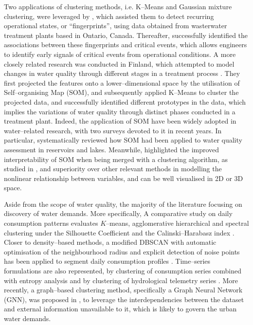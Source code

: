 Two applications of clustering methods, i.e. K–Means and Gaussian mixture clustering, were leveraged by \cite{ref_13}, which assisted them to detect recurring operational states, or ``fingerprints'', using data obtained from wasterwater treatment plants based in Ontario, Canada.
Thereafter, successfully identified the associations between these fingerprints and critical events, which allows engineers to identify early signals of critical events from operational conditions.
A more closely related research was conducted in Finland, which attempted to model changes in water quality through different stages in a treatment process \cite{ref_14}. They first projected the features onto a lower–dimensional space by the utilisation of Self–organising Map (SOM), and subsequently applied K–Means to cluster the projected data, and successfully identified different prototypes in the data, which implies the variations of water quality through distinct phases conducted in a treatment plant.
Indeed, the application of SOM have been widely adopted in water–related research, with two surveys devoted to it in recent years. In particular, \cite{ref_15} systematically reviewed how SOM had been applied to water quality assessment in reservoirs and lakes. 
Meanwhile, \cite{ref_16} highlighted the improved interpretability of SOM when being merged with a clustering algorithm, as studied in \cite{ref_14}, and superiority over other relevant methods in modelling the nonlinear relationship between variables, and can be well visualised in 2D or 3D space.

Aside from the scope of water quality, the majority of the literature focusing on discovery of water demands. More specifically, 
A comparative study on daily consumption patterns evaluates $K$–means, agglomerative hierarchical and spectral clustering under the Silhouette Coefficient and the Calinski–Harabasz index \cite{ref_17}.
Closer to density–based methods, a modified DBSCAN with automatic optimisation of the neighbourhood radius and explicit detection of noise points has been applied to segment daily consumption profiles \cite{ref_18}.
Time–series formulations are also represented, by clustering of consumption series combined with entropy analysis \cite{ref_19} and by clustering of hydrological telemetry series \cite{ref_20}.
More recently, a graph–based clustering method, specifically a Graph Neural Network (GNN), was proposed in \cite{ref_21}, to leverage the interdependencies between the dataset and external information unavailable to it, which is likely to govern the urban water demands.

